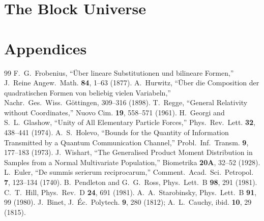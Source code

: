 \documentclass[12pt]{article}
\theoremstyle{remark}
\theoremstyle{definition}
\begin{document}


\part{The Block Universe}



\appendix
\part*{Appendices}

% 

\begin{thebibliography}{99}
 F.~G.~Frobenius, ``\"Uber lineare Substitutionen und bilineare Formen,'' J.~Reine Angew.~Math. \textbf{84}, 1--63 (1877).
 A.~Hurwitz, ``\"Uber die Composition der quadratischen Formen von beliebig vielen Variabeln,'' Nachr.~Ges.~Wiss.~G\"ottingen, 309--316 (1898).
 T.~Regge, ``General Relativity without Coordinates,'' Nuovo Cim. \textbf{19}, 558--571 (1961).
 H.~Georgi and S.~L.~Glashow, ``Unity of All Elementary Particle Forces,'' Phys.~Rev.~Lett. \textbf{32}, 438--441 (1974).
 A.~S.~Holevo, ``Bounds for the Quantity of Information Transmitted by a Quantum Communication Channel,'' Probl.~Inf.~Transm. \textbf{9}, 177--183 (1973).
 J.~Wishart, ``The Generalised Product Moment Distribution in Samples from a Normal Multivariate Population,'' Biometrika \textbf{20A}, 32--52 (1928).
 L.~Euler, ``De summis serierum reciprocarum,'' Comment.~Acad.~Sci.~Petropol. \textbf{7}, 123--134 (1740).
 B.~Pendleton and G.~G.~Ross, Phys.~Lett.~B \textbf{98}, 291 (1981).
 C.~T.~Hill, Phys.~Rev.~D \textbf{24}, 691 (1981).
 A.~A.~Starobinsky, Phys.~Lett.~B \textbf{91}, 99 (1980).
 J.~Binet, J.~\'Ec.~Polytech. \textbf{9}, 280 (1812); A.~L.~Cauchy, ibid. \textbf{10}, 29 (1815).
\end{thebibliography}
\end{document}

